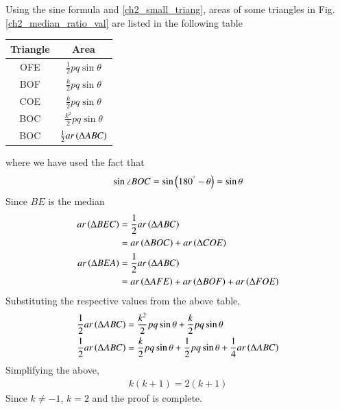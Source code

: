 \proof Using the sine formula and \eqref{ch2_small_triang}, areas of some triangles in Fig. \ref{ch2_median_ratio_val} are listed in the following table
\begin{center}
\begin{tabular}{|c|c|}
	\hline  Triangle& Area  \\ 
	\hline  OFE & $\frac{1}{2}pq \sin \theta $ \\ 
	\hline  BOF &  $\frac{k}{2}pq \sin \theta$\\ 
	\hline  COE & $\frac{k}{2}pq \sin \theta$ \\ 
	\hline  BOC&  $\frac{k^2}{2}pq \sin \theta$\\
	\hline  BOC&  $\frac{1}{2} ar \left(\Delta ABC\right)$\\  
	\hline 
\end{tabular} 
\end{center}
%
where we have used the fact that 
%
\begin{equation}
\sin \angle BOC = \sin \left(180^{\degree}-\theta\right) = \sin \theta
\end{equation}
%
Since $BE$ is the median
\begin{align}
\begin{split}
ar\left(\Delta BEC\right) &= \frac{1}{2} ar\left(\Delta ABC\right)  
\\
& = ar\left(\Delta BOC\right) + ar\left(\Delta COE\right)\\
ar\left(\Delta BEA\right) &= \frac{1}{2} ar\left(\Delta ABC\right)
\\
& = ar\left(\Delta AFE\right) + ar\left(\Delta BOF\right) +  ar\left(\Delta FOE\right)  
\end{split}
\end{align}
%
Substituting the respective values from the above table,
\begin{align}
\begin{split}
\frac{1}{2} ar\left(\Delta ABC\right) &= \frac{k^2}{2}pq \sin \theta + \frac{k}{2}pq \sin \theta
\\
\frac{1}{2} ar\left(\Delta ABC\right) &= \frac{k}{2}pq \sin \theta + \frac{1}{2}pq \sin \theta + \frac{1}{4} ar\left(\Delta ABC\right)
\end{split}
\end{align}
%
Simplifying the above,
%
\begin{align}
k(k+1) = 2(k+1)
\end{align}
%
Since $k \neq -1$, $k = 2$ and the proof is complete.

